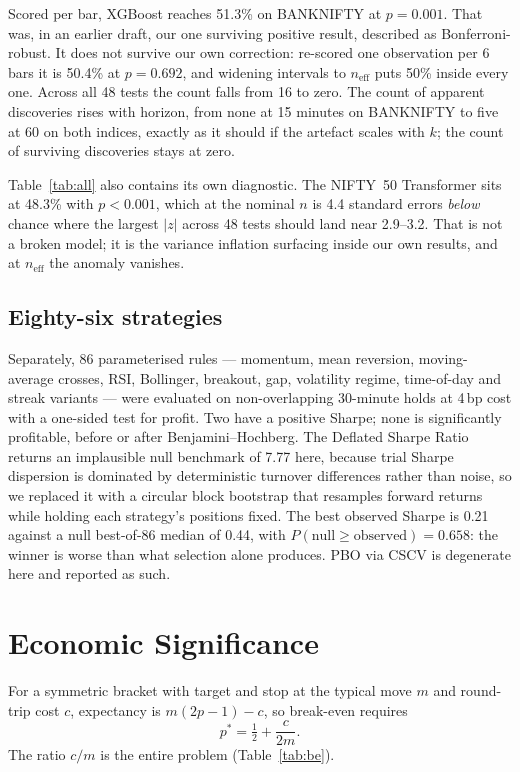 \documentclass[sigconf,nonacm]{acmart}
\begin{document}
Scored per bar, XGBoost reaches 51.3\% on BANKNIFTY at $p=0.001$. That was, in
an earlier draft, our one surviving positive result, described as
Bonferroni-robust. It does not survive our own correction: re-scored one
observation per 6 bars it is 50.4\% at $p=0.692$, and widening intervals to
$n_{\text{eff}}$ puts 50\% inside every one. Across all 48 tests the count falls
from 16 to zero. The count of apparent discoveries rises with horizon, from none
at 15 minutes on BANKNIFTY to five at 60 on both indices, exactly as it should if the
artefact scales with $k$; the count of surviving discoveries stays at zero.

Table~\ref{tab:all} also contains its own diagnostic. The NIFTY~50 Transformer
sits at 48.3\% with $p<0.001$, which at the nominal $n$ is 4.4 standard errors
\emph{below} chance where the largest $|z|$ across 48 tests should land near
2.9--3.2. That is not a broken model; it is the variance inflation
surfacing inside our own results, and at $n_{\text{eff}}$ the anomaly vanishes.

\subsection{Eighty-six strategies}

Separately, 86 parameterised rules --- momentum, mean reversion, moving-average
crosses, RSI, Bollinger, breakout, gap, volatility regime, time-of-day and
streak variants --- were evaluated on non-overlapping 30-minute holds at 4\,bp
cost with a one-sided test for profit. Two have a positive Sharpe; none is
significantly profitable, before or after Benjamini--Hochberg. The Deflated
Sharpe Ratio returns an implausible null benchmark of 7.77 here, because trial
Sharpe dispersion is dominated by deterministic turnover differences rather than
noise, so we replaced it with a circular block bootstrap \cite{politis1992} that
resamples forward returns while holding each strategy's positions fixed. The
best observed Sharpe is 0.21 against a null best-of-86 median of 0.44, with
$P(\text{null} \geq \text{observed}) = 0.658$: the winner is worse than what
selection alone produces. PBO via CSCV \cite{bailey2017} is degenerate here and
reported as such.

\section{Economic Significance}
\label{sec:econ}

For a symmetric bracket with target and stop at the typical move $m$ and
round-trip cost $c$, expectancy is $m(2p-1) - c$, so break-even requires
\begin{equation}
p^{\ast} = \tfrac{1}{2} + \frac{c}{2m}.
\label{eq:be}
\end{equation}
The ratio $c/m$ is the entire problem (Table~\ref{tab:be}).
\end{document}
